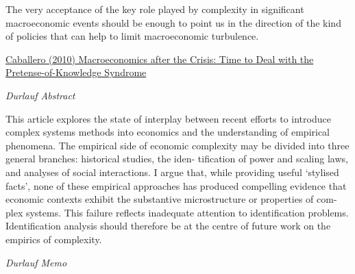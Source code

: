 \documentclass[
]{book}
\begin{document}
The very acceptance of the key role played by complexity in significant
macroeconomic events should be enough to point us in the direction of the kind of policies that
can help to limit macroeconomic turbulence.

\href{pdf/Caballero_2010_Macro_after_Crisis.pdf}{Caballero (2010) Macroeconomics after the Crisis: Time to Deal with the Pretense-of-Knowledge Syndrome}

\emph{Durlauf Abstract}

This article explores the state of interplay between recent efforts to introduce complex systems
methods into economics and the understanding of empirical phenomena. The empirical side of
economic complexity may be divided into three general branches: historical studies, the iden-
tification of power and scaling laws, and analyses of social interactions. I argue that, while
providing useful `stylised facts', none of these empirical approaches has produced compelling
evidence that economic contexts exhibit the substantive microstructure or properties of com-
plex systems. This failure reflects inadequate attention to identification problems. Identification
analysis should therefore be at the centre of future work on the empirics of complexity.

\emph{Durlauf Memo}
\end{document}
